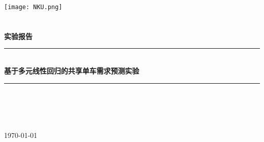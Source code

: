 \documentclass[UTF8,a4paper,10pt]{ctexart}
\newcommand{\HRule}{\rule{\linewidth}{0.5mm}}%
\begin{document}
\begin{titlepage}
    \begin{center}
    \texttt{[image: NKU.png]}\\[1cm]        %
    \textsc{\Huge {} }\\[0.9cm]
    \textsc{\huge {}}\\[0.5cm]
    \textsc{\Large \textbf{实验报告}}\\[0.8cm]
    \HRule \\[0.9cm]
    { \LARGE \bfseries 基于多元线性回归的共享单车需求预测实验 }\\[0.4cm]  %
    \HRule \\[2.0cm]
    \centering
    \textsc{\LARGE {}}\\[0.5cm]  %
    \textsc{\LARGE {}}\\[0.5cm]  %
    \textsc{\LARGE {}}\\[0.5cm]  %
    \vfill
    {\Large \today}
    \end{center}
\end{titlepage}
\end{document}
